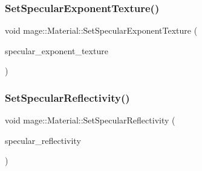 \hypertarget{structmage_1_1_material_ae07cb5f8c3b4ee0d6e6f4f91c1cbbf35}{}\label{structmage_1_1_material_ae07cb5f8c3b4ee0d6e6f4f91c1cbbf35} 
\subsubsection{\texorpdfstring{Set\+Specular\+Exponent\+Texture()}{SetSpecularExponentTexture()}}
{\footnotesize\ttfamily void mage\+::\+Material\+::\+Set\+Specular\+Exponent\+Texture (\begin{DoxyParamCaption}\item[{\hyperlink{namespacemage_a1e01ae66713838a7a67d30e44c67703e}{Shared\+Ptr}$<$ \hyperlink{classmage_1_1_texture}{Texture} $>$}]{specular\+\_\+exponent\+\_\+texture }\end{DoxyParamCaption})}

\hypertarget{structmage_1_1_material_ac615e33c8e17149345488fed5c16dc7b}{}\label{structmage_1_1_material_ac615e33c8e17149345488fed5c16dc7b} 
\subsubsection{\texorpdfstring{Set\+Specular\+Reflectivity()}{SetSpecularReflectivity()}\hspace{0.1cm}{\footnotesize\ttfamily [1/2]}}
{\footnotesize\ttfamily void mage\+::\+Material\+::\+Set\+Specular\+Reflectivity (\begin{DoxyParamCaption}\item[{const \hyperlink{structmage_1_1_r_g_b_spectrum}{R\+G\+B\+Spectrum} \&}]{specular\+\_\+reflectivity }\end{DoxyParamCaption})\hspace{0.3cm}{\ttfamily [noexcept]}}

\hypertarget{structmage_1_1_material_ade7fe7386618bd139e9c43699eba0a20}{}\label{structmage_1_1_material_ade7fe7386618bd139e9c43699eba0a20} 
